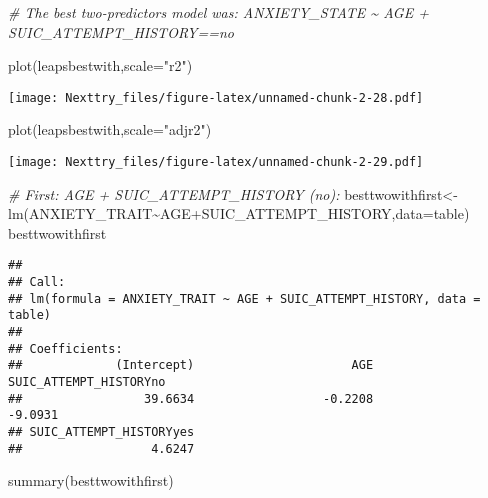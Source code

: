 \documentclass[
]{book}
\newenvironment{Shaded}{\begin{snugshade}}{\end{snugshade}}
\newcommand{\AttributeTok}[1]{\textcolor[rgb]{0.77,0.63,0.00}{#1}}
\newcommand{\CommentTok}[1]{\textcolor[rgb]{0.56,0.35,0.01}{\textit{#1}}}
\newcommand{\FunctionTok}[1]{\textcolor[rgb]{0.00,0.00,0.00}{#1}}
\newcommand{\NormalTok}[1]{#1}
\newcommand{\OtherTok}[1]{\textcolor[rgb]{0.56,0.35,0.01}{#1}}
\newcommand{\SpecialCharTok}[1]{\textcolor[rgb]{0.00,0.00,0.00}{#1}}
\newcommand{\StringTok}[1]{\textcolor[rgb]{0.31,0.60,0.02}{#1}}
\begin{document}
\begin{Shaded}
\begin{Highlighting}[]
\CommentTok{\# The best two{-}predictors model was: ANXIETY\_STATE \textasciitilde{} AGE + SUIC\_ATTEMPT\_HISTORY==no}

\FunctionTok{plot}\NormalTok{(leapsbestwith,}\AttributeTok{scale=}\StringTok{"r2"}\NormalTok{)}
\end{Highlighting}
\end{Shaded}

\texttt{[image: Nexttry\_files/figure-latex/unnamed-chunk-2-28.pdf]}

\begin{Shaded}
\begin{Highlighting}[]
\FunctionTok{plot}\NormalTok{(leapsbestwith,}\AttributeTok{scale=}\StringTok{"adjr2"}\NormalTok{)}
\end{Highlighting}
\end{Shaded}

\texttt{[image: Nexttry\_files/figure-latex/unnamed-chunk-2-29.pdf]}

\begin{Shaded}
\begin{Highlighting}[]
\CommentTok{\# First: AGE + SUIC\_ATTEMPT\_HISTORY (no):}
\NormalTok{besttwowithfirst}\OtherTok{\textless{}{-}}\FunctionTok{lm}\NormalTok{(ANXIETY\_TRAIT}\SpecialCharTok{\textasciitilde{}}\NormalTok{AGE}\SpecialCharTok{+}\NormalTok{SUIC\_ATTEMPT\_HISTORY,}\AttributeTok{data=}\NormalTok{table)}
\NormalTok{besttwowithfirst}
\end{Highlighting}
\end{Shaded}

\begin{verbatim}
## 
## Call:
## lm(formula = ANXIETY_TRAIT ~ AGE + SUIC_ATTEMPT_HISTORY, data = table)
## 
## Coefficients:
##             (Intercept)                      AGE   SUIC_ATTEMPT_HISTORYno  
##                 39.6634                  -0.2208                  -9.0931  
## SUIC_ATTEMPT_HISTORYyes  
##                  4.6247
\end{verbatim}

\begin{Shaded}
\begin{Highlighting}[]
\FunctionTok{summary}\NormalTok{(besttwowithfirst)}
\end{Highlighting}
\end{Shaded}
\end{document}
